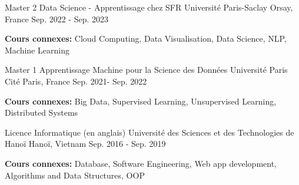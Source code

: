 

\begin{cventries}

  \cventry
    {Master 2 Data Science - Apprentissage chez SFR} %
    {Université Paris-Saclay} %
    {Orsay, France} %
    {Sep. 2022 - Sep. 2023} %
    {
      \begin{cvitems} %
        \item {\textbf{Cours connexes:} Cloud Computing, Data Visualisation, Data Science, NLP, Machine Learning}
      \end{cvitems}
    }

  \cventry
    {Master 1 Apprentissage Machine pour la Science des Données} %
    {Université Paris Cité} %
    {Paris, France} %
    {Sep. 2021- Sep. 2022} %
    {
      \begin{cvitems} %
        \item {\textbf{Cours connexes:} Big Data, Supervised Learning, Unsupervised Learning, Distributed Systems}
      \end{cvitems}
    }

  \cventry
    {Licence Informatique (en anglais)} %
    {Université des Sciences et des Technologies de Hanoï} %
    {Hanoï, Vietnam} %
    {Sep. 2016 - Sep. 2019} %
    {
      \begin{cvitems} %
        \item {\textbf{Cours connexes:} Database, Software Engineering, Web app development, Algorithms and Data Structures, OOP}
      \end{cvitems}
    }

\end{cventries}
